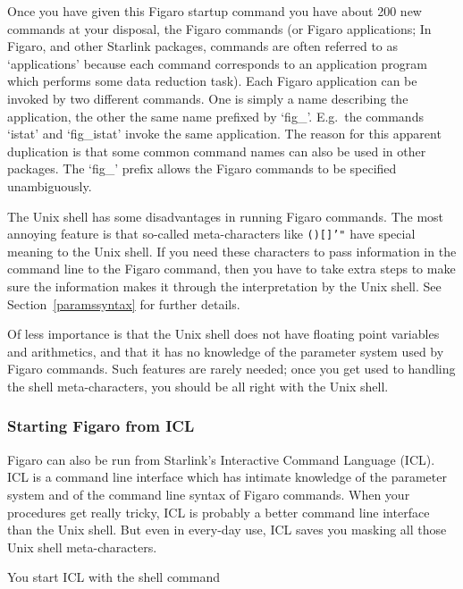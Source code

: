 \documentclass[11pt,twoside]{article}
\newenvironment{latexonly}{}{}
\newcommand{\htmlref}[2]{#1}
\begin{document}
   Once you have given this Figaro startup command you have about 200
   new commands at your disposal, the Figaro commands (or Figaro
   applications; In Figaro, and other Starlink packages, commands are
   often referred to as `applications' because each command corresponds
   to an application program which performs some data reduction task).
   Each Figaro application can be invoked by two different commands.
   One is simply a name describing the application, the other the same
   name prefixed by `fig\_'.  E.g.\ the commands `istat' and `fig\_istat'
   invoke the same application.  The reason for this apparent duplication
   is that some common command names can also be used in other packages.
   The `fig\_' prefix allows the Figaro commands to be specified
   unambiguously.

   The Unix shell has some disadvantages in running Figaro commands. The
   most annoying feature is that so-called meta-characters like
{\tt ()[]'"}
   have special meaning to the Unix shell. If you need these characters
   to pass information in the command line to the Figaro command, then
   you have to take
\htmlref{extra steps}{paramssyntax}
   to make sure the information makes it through the interpretation by
   the Unix shell.
\begin{latexonly}
   See Section~\ref{paramssyntax} for further details.
\end{latexonly}

   Of less importance is that the Unix shell does not have floating
   point variables and arithmetics, and that it has no knowledge of the
   parameter system used by Figaro commands. Such features are rarely
   needed; once you get used to handling the shell meta-characters,
   you should be all right with the Unix shell.

\subsubsection{Starting Figaro from ICL}

   Figaro can also be run from Starlink's Interactive Command Language
   (ICL).  ICL is a command line interface which has intimate knowledge of
   the parameter system and of the command line syntax of Figaro commands.
   When your procedures get really tricky, ICL is probably a better command
   line interface than the Unix shell.  But even in every-day use, ICL
   saves you masking all those Unix shell meta-characters.

   You start ICL with the shell command
\end{document}
